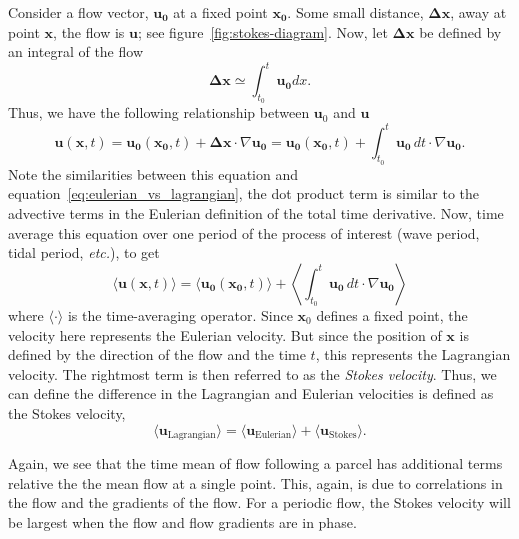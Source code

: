 \documentclass[11pt]{report}
\numberwithin{equation}{section}
\begin{document}
Consider a flow vector, $\mathbf{u_0}$ at a fixed point $\mathbf{x_0}$.  Some small distance, $\mathbf{\Delta x}$, away at point $\mathbf{x}$, the flow is $\mathbf{u}$; see figure~\ref{fig:stokes-diagram}.  Now, let $\mathbf{\Delta x}$ be defined by an integral of the flow
\begin{equation}
    \mathbf{\Delta x} \simeq \int_{t_0}^{t} \mathbf{u_0} dx.
\end{equation}
Thus, we have the following relationship between $\mathbf u_0$ and $\mathbf u$
\begin{equation}
    \mathbf{u}(\mathbf{x}, t) = \mathbf{u_0}(\mathbf{x_0}, t) + \mathbf{\Delta x}\cdot\nabla\mathbf{u_0}
     = \mathbf{u_0}(\mathbf{x_0}, t) + \int_{t_0}^{t} \mathbf{u_0}\,dt\cdot\nabla\mathbf{u_0}.
\end{equation}
Note the similarities between this equation and equation~\ref{eq:eulerian_vs_lagrangian}, the dot product term is similar to the advective terms in the Eulerian definition of the total time derivative.  Now, time average this equation over one period of the process of interest (wave period, tidal period, \emph{etc.}), to get
\begin{equation}
    \langle \mathbf{u}(\mathbf{x}, t) \rangle
     = \langle \mathbf{u_0}(\mathbf{x_0}, t) \rangle 
     + \left\langle \int_{t_0}^{t} \mathbf{u_0}\,dt\cdot\nabla\mathbf{u_0} \right\rangle
\end{equation}
where $\langle\cdot\rangle$ is the time-averaging operator.  Since $\mathbf x_0$ defines a fixed point, the velocity here represents the Eulerian velocity.   But since the position of $\mathbf x$ is defined by the direction of the flow and the time $t$, this represents the Lagrangian velocity.  The rightmost term is then referred to as the {\it Stokes velocity}.  Thus, we can define the difference in the Lagrangian and Eulerian velocities is defined as the Stokes velocity,
\begin{equation}
    \langle \mathbf{u_{\mathrm{Lagrangian}}} \rangle = 
        \langle \mathbf{u_{\mathrm{Eulerian}}} \rangle + 
        \langle \mathbf{u_{\mathrm{Stokes}}} \rangle.
\end{equation}

Again, we see that the time mean of flow following a parcel has additional terms relative the the mean flow at a single point.  This, again, is due to correlations in the flow and the gradients of the flow.  For a periodic flow, the Stokes velocity will be largest when the flow and flow gradients are in phase.  
\end{document}
